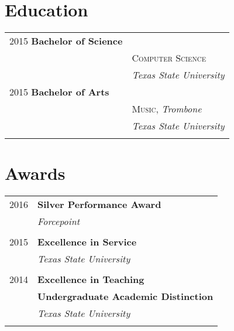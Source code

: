 \documentclass[10pt]{article} %
\begin{document}
\begin{minipage}[t]{0.44\textwidth}
\section{Education} 

\begin{tabular}{ll} %


2015 \textbf{Bachelor of Science} \\ 
& \textsc{Computer Science} \\ 
& \textit{Texas State University}\\

	 

2015 \textbf{Bachelor of Arts} \\ 
& \textsc{Music}, \textit{Trombone}\\ 
& \textit{Texas State University}\\ \\

\end{tabular}


\section{Awards} 

\begin{tabular}{rl}
2016     & \textbf{Silver Performance Award}\\
& \textit{Forcepoint}\\ \\
2015     & \textbf{Excellence in Service}\\
& \textit{Texas State University}\\ \\
2014	 & \textbf{Excellence in Teaching}\\
	 & \textbf{Undergraduate Academic Distinction}\\
& \textit{Texas State University}\\ \\


\end{tabular}
\end{minipage}
\end{document}
